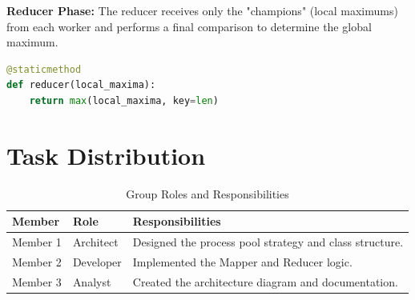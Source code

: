 \documentclass[a4paper,11pt]{article}
\begin{document}
\textbf{Reducer Phase:}
The reducer receives only the "champions" (local maximums) from each worker and performs a final comparison to determine the global maximum.

\begin{lstlisting}[language=Python]
@staticmethod
def reducer(local_maxima):
    return max(local_maxima, key=len)
\end{lstlisting}

\section{Task Distribution}
\begin{table}[h]
\centering
\begin{tabular}{|l|l|l|}
\hline
\textbf{Member} & \textbf{Role} & \textbf{Responsibilities} \\ \hline
Member 1 & Architect & Designed the process pool strategy and class structure. \\ \hline
Member 2 & Developer & Implemented the Mapper and Reducer logic. \\ \hline
Member 3 & Analyst & Created the architecture diagram and documentation. \\ \hline
\end{tabular}
\caption{Group Roles and Responsibilities}
\end{table}
\end{document}
